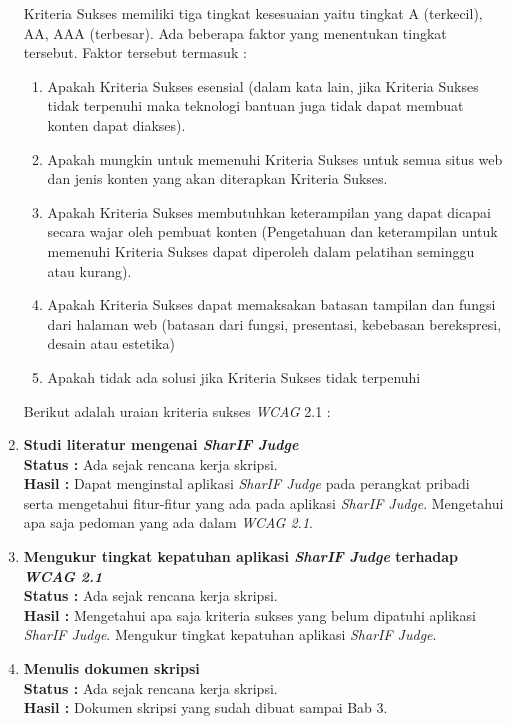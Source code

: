 \documentclass[a4paper,twoside]{article}
\begin{document}
\begin{enumerate}
		Kriteria Sukses memiliki tiga tingkat kesesuaian yaitu tingkat A (terkecil), AA, AAA (terbesar). Ada beberapa faktor yang menentukan tingkat tersebut. Faktor tersebut termasuk :
		
		\begin{enumerate}
			\item Apakah Kriteria Sukses esensial (dalam kata lain, jika Kriteria Sukses tidak terpenuhi maka teknologi bantuan juga tidak dapat membuat konten dapat diakses).
			\item Apakah mungkin untuk memenuhi Kriteria Sukses untuk semua situs web dan jenis konten yang akan diterapkan Kriteria Sukses.
			\item Apakah Kriteria Sukses membutuhkan keterampilan yang dapat dicapai secara wajar oleh pembuat konten (Pengetahuan dan keterampilan untuk memenuhi Kriteria Sukses dapat diperoleh dalam pelatihan seminggu atau kurang).
			\item Apakah Kriteria Sukses dapat memaksakan batasan tampilan dan fungsi dari halaman web (batasan dari fungsi, presentasi, kebebasan berekspresi, desain atau estetika)
			\item Apakah tidak ada solusi jika Kriteria Sukses tidak terpenuhi
		\end{enumerate}
		
		Berikut adalah uraian kriteria sukses \textit{WCAG} 2.1 :		
		 
		
		\item \textbf{Studi literatur mengenai \textit{SharIF Judge}}\\
		{\bf Status :} Ada sejak rencana kerja skripsi.\\
		{\bf Hasil :} Dapat menginstal aplikasi \textit{SharIF Judge} pada perangkat pribadi serta mengetahui fitur-fitur yang ada pada aplikasi \textit{SharIF Judge}. Mengetahui apa saja pedoman yang ada dalam \textit{WCAG 2.1}.
		
		
		\item \textbf{Mengukur tingkat kepatuhan aplikasi \textit{SharIF Judge} terhadap \textit{WCAG 2.1}}\\
		{\bf Status :} Ada sejak rencana kerja skripsi.\\
		{\bf Hasil :} Mengetahui apa saja kriteria sukses yang belum dipatuhi aplikasi \textit{SharIF Judge}. Mengukur tingkat kepatuhan aplikasi \textit{SharIF Judge}.

		\item \textbf{Menulis dokumen skripsi}\\
		{\bf Status :} Ada sejak rencana kerja skripsi.\\
		{\bf Hasil :} Dokumen skripsi yang sudah dibuat sampai Bab 3.

	\end{enumerate}
\end{document}
